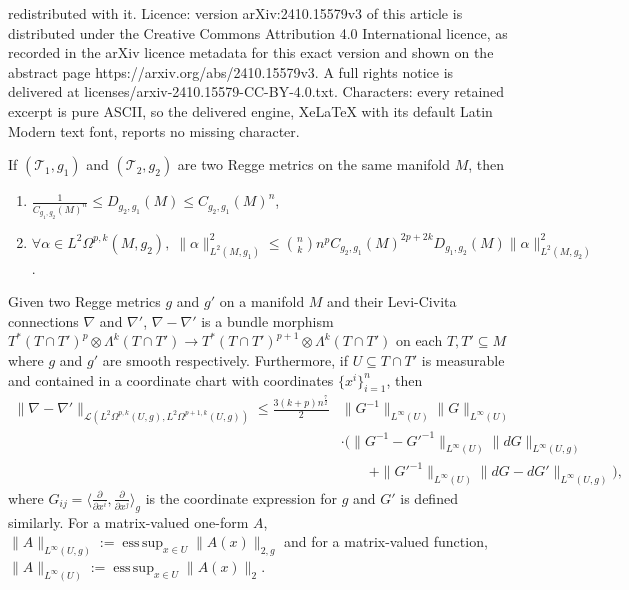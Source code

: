 \documentclass[10pt,a4paper]{amsart}
\DeclareMathOperator*{\esssup}{ess\,sup}
\newcommand{\iprod}[1]{\langle #1 \rangle}
\newcommand{\pdiff}[2]{\frac{\partial #1}{\partial #2}}
\begin{document}
redistributed with it. Licence: version arXiv:2410.15579v3 of this article is distributed under the Creative Commons Attribution 4.0 International licence, as recorded in the arXiv licence metadata for this exact version and shown on the abstract page https://arxiv.org/abs/2410.15579v3. A full rights notice is delivered at licenses/arxiv-2410.15579-CC-BY-4.0.txt. Characters: every retained excerpt is pure ASCII, so the delivered engine, XeLaTeX with its default Latin Modern text font, reports no missing character.
\begin{theorem}\label{L2_equiv}
If $(\mathcal{T}_1,g_1)$ and $(\mathcal{T}_2,g_2)$ are two Regge metrics on the same manifold $M$, then
\begin{enumerate}
\item{$ \frac{1}{C_{g_1,g_2}(M)^n} \le D_{g_2,g_1}(M) \le C_{g_2,g_1}(M)^n$},
\item{$\displaystyle{\forall \alpha \in L^2\Omega^{p,k}(M,g_2), \;\|\alpha\|_{L^2(M,g_1)}^2 \le{n \choose k}n^pC_{g_2,g_1}(M)^{2p + 2k}D_{g_1,g_2}(M)\|\alpha\|_{L^2(M,g_2)}^2}$.}
\end{enumerate}
\end{theorem}

\begin{lemma}
\label{compare_cov}
Given two Regge metrics $g$ and $g'$ on a manifold $M$ and their Levi-Civita connections $\nabla$ and $\nabla'$, $\nabla - \nabla'$ is a bundle morphism $T^*(T \cap T')^p \otimes \Lambda^k(T \cap T') \to T^*(T \cap T')^{p+1} \otimes \Lambda^k(T \cap T')$ on each $T, T' \subseteq M$ where $g$ and $g'$ are smooth respectively. Furthermore, if $U \subseteq T \cap T'$ is measurable and contained in a coordinate chart with coordinates $\{x^i\}_{i = 1}^n$, then
\begin{align*}
\|\nabla - \nabla'\|_{\mathcal{L}(L^2\Omega^{p,k}(U,g),L^2\Omega^{p+1,k}(U,g))} \le \frac{3(k+p)n^\frac{7}{2}}{2}&\|G^{-1}\|_{L^\infty(U)}\|G\|_{L^\infty(U)}\\
&\cdot \big(\|G^{-1} - G'^{-1}\|_{L^\infty(U)}\|dG\|_{L^\infty(U,g)} \\
&\quad\quad + \|G'^{-1}\|_{L^\infty(U)}\|dG - dG'\|_{L^\infty(U,g)}\big),
\end{align*}
where $G_{ij} = \iprod{\pdiff{}{x^i},\pdiff{}{x^j}}_g$ is the coordinate expression for $g$ and $G'$ is defined similarly. For a matrix-valued one-form $A$, $\|A\|_{L^\infty(U,g)} := \esssup_{x \in U} \|A(x)\|_{2,g}$ and for a matrix-valued function, $\|A\|_{L^\infty(U)} := \esssup_{x \in U} \|A(x)\|_2$.
\end{lemma}
\end{document}
